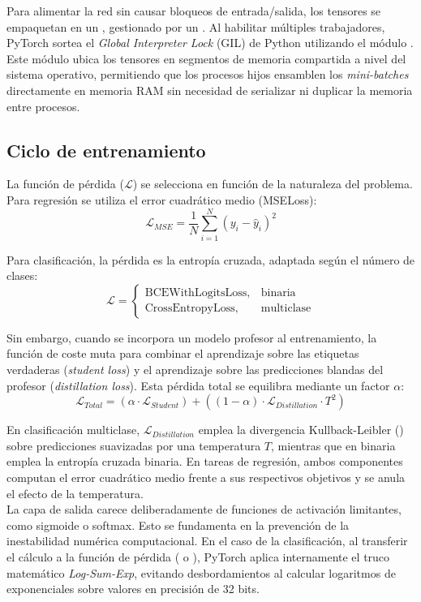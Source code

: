 \documentclass[a4paper,12pt,twoside,final]{book}
\begin{document}
Para alimentar la red sin causar bloqueos de entrada/salida, los tensores se empaquetan en un ,
gestionado por un . Al habilitar múltiples trabajadores, PyTorch sortea el \textit{Global Interpreter
Lock} (GIL) de Python utilizando el módulo . Este módulo ubica los tensores en segmentos de
memoria compartida a nivel del sistema operativo, permitiendo que los procesos hijos ensamblen los
\textit{mini-batches} directamente en memoria RAM sin necesidad de serializar ni duplicar la memoria entre procesos.

\subsection{Ciclo de entrenamiento}
La función de pérdida ($\mathcal{L}$) se selecciona en función de la naturaleza del problema. Para regresión se utiliza
el error cuadrático medio (MSELoss):
\[
\mathcal{L}_{MSE} = \frac{1}{N} \sum_{i=1}^{N} (y_i - \hat{y}_i)^2
\]

Para clasificación, la pérdida es la entropía cruzada, adaptada según el número de clases:
\[
\mathcal{L} =  \begin{cases}  \mathrm{BCEWithLogitsLoss}, & \text{binaria} 
  \\ \mathrm{CrossEntropyLoss}, & \text{multiclase} \end{cases}
\]

Sin embargo, cuando se incorpora un modelo profesor al entrenamiento, la función de coste muta para combinar el
aprendizaje sobre las etiquetas verdaderas (\textit{student loss}) y el aprendizaje sobre las predicciones blandas del
profesor (\textit{distillation loss}). Esta pérdida total se equilibra mediante un factor $\alpha$:
\[
\mathcal{L}_{Total} = (\alpha \cdot \mathcal{L}_{Student}) + ((1 - \alpha) \cdot \mathcal{L}_{Distillation} \cdot T^2)
\]

En clasificación multiclase, $\mathcal{L}_{Distillation}$ emplea la divergencia Kullback-Leibler ()
sobre predicciones suavizadas por una temperatura $T$, mientras que en binaria emplea la entropía cruzada binaria.
En tareas de regresión, ambos componentes computan el error cuadrático medio frente a sus respectivos objetivos y se
anula el efecto de la temperatura.\\

La capa de salida carece deliberadamente de funciones de activación limitantes, como sigmoide o softmax. Esto se
fundamenta en la prevención de la inestabilidad numérica computacional. En el caso de la clasificación, al transferir
el cálculo a la función de pérdida ( o ), PyTorch aplica internamente el
truco matemático \textit{Log-Sum-Exp}, evitando desbordamientos al calcular logaritmos de exponenciales sobre valores
en precisión de 32 bits.\\
\end{document}
